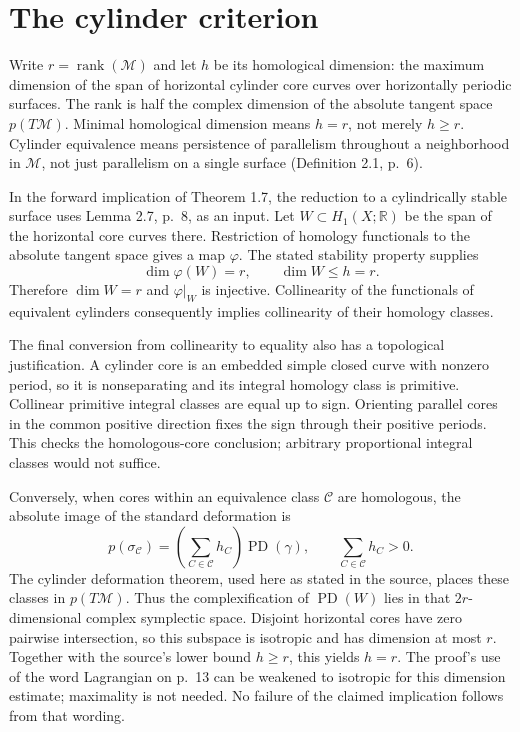 \documentclass[10pt]{article}
\begin{document}
\section*{The cylinder criterion}
Write \(r=\operatorname{rank}(\mathcal M)\) and let \(h\) be its homological dimension: the maximum dimension of the span of horizontal cylinder core curves over horizontally periodic surfaces. The rank is half the complex dimension of the absolute tangent space \(p(T\mathcal M)\). Minimal homological dimension means \(h=r\), not merely \(h\geq r\). Cylinder equivalence means persistence of parallelism throughout a neighborhood in \(\mathcal M\), not just parallelism on a single surface (Definition 2.1, p. 6).\par
In the forward implication of Theorem 1.7, the reduction to a cylindrically stable surface uses Lemma 2.7, p. 8, as an input. Let \(W\subset H_1(X;\mathbb R)\) be the span of the horizontal core curves there. Restriction of homology functionals to the absolute tangent space gives a map \(\varphi\). The stated stability property supplies \[\dim\varphi(W)=r,\qquad \dim W\leq h=r.\] Therefore \(\dim W=r\) and \(\varphi|_W\) is injective. Collinearity of the functionals of equivalent cylinders consequently implies collinearity of their homology classes.\par
The final conversion from collinearity to equality also has a topological justification. A cylinder core is an embedded simple closed curve with nonzero period, so it is nonseparating and its integral homology class is primitive. Collinear primitive integral classes are equal up to sign. Orienting parallel cores in the common positive direction fixes the sign through their positive periods. This checks the homologous-core conclusion; arbitrary proportional integral classes would not suffice.\par
Conversely, when cores within an equivalence class \(\mathcal C\) are homologous, the absolute image of the standard deformation is \[p(\sigma_{\mathcal C})=
 \left(\sum_{C\in\mathcal C}h_C\right)\operatorname{PD}(\gamma),
 \qquad \sum_{C\in\mathcal C}h_C>0 .\] The cylinder deformation theorem, used here as stated in the source, places these classes in \(p(T\mathcal M)\). Thus the complexification of \(\operatorname{PD}(W)\) lies in that \(2r\)-dimensional complex symplectic space. Disjoint horizontal cores have zero pairwise intersection, so this subspace is isotropic and has dimension at most \(r\). Together with the source’s lower bound \(h\geq r\), this yields \(h=r\). The proof’s use of the word Lagrangian on p. 13 can be weakened to isotropic for this dimension estimate; maximality is not needed. No failure of the claimed implication follows from that wording.\par
\end{document}
